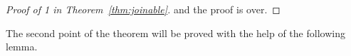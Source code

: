 \documentclass[12pt,a4paper]{article}
\begin{document}
\begin{proof}[Proof of 1 in Theorem~\ref{thm:joinable}]
%
%
%
%
%
%
%
%
%
%
%
and the proof is over.
\end{proof}

The second point of the theorem will be proved with the help of the following lemma. 
\end{document}
